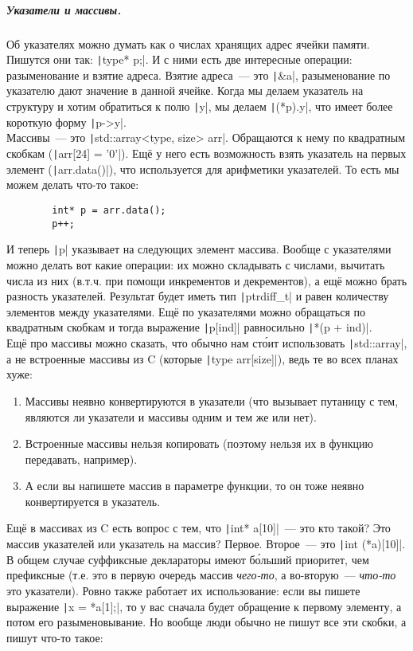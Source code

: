 \documentclass{article}
\begin{document}
    \subparagraph{Указатели и массивы.}
    Об указателях можно думать как о числах хранящих адрес ячейки памяти. Пишутся они так: \texttt|type* p;|. И с ними есть две интересные операции: разыменование и взятие адреса. Взятие адреса~--- это \texttt|&a|, разыменование по указателю дают значение в данной ячейке. Когда мы делаем указатель на структуру и хотим обратиться к полю \texttt|y|, мы делаем \texttt|(*p).y|, что имеет более короткую форму \texttt|p->y|.\\
    Массивы~--- это \texttt|std::array<type, size> arr|. Обращаются к нему по квадратным скобкам (\texttt|arr[24] = '0'|). Ещё у него есть возможность взять указатель на первых элемент (\texttt|arr.data()|), что используется для арифметики указателей. То есть мы можем делать что-то такое:
    \begin{verbatim}
        int* p = arr.data();
        p++;
    \end{verbatim}
    И теперь \texttt|p| указывает на следующих элемент массива. Вообще с указателями можно делать вот какие операции: их можно складывать с числами, вычитать числа из них (в.т.ч. при помощи инкрементов и декрементов), а ещё можно брать разность указателей. Результат будет иметь тип \texttt|ptrdiff_t| и равен количеству элементов между указателями. Ещё по указателями можно обращаться по квадратным скобкам и тогда выражение \texttt|p[ind]| равносильно \texttt|*(p + ind)|.\\
    Ещё про массивы можно сказать, что обычно нам ст\'{о}ит использовать \texttt|std::array|, а не встроенные массивы из C (которые \texttt|type arr[size]|), ведь те во всех планах хуже:
    \begin{enumerate}
        \item Массивы неявно конвертируются в указатели (что вызывает путаницу с тем, являются ли указатели и массивы одним и тем же или нет).
        \item Встроенные массивы нельзя копировать (поэтому нельзя их в функцию передавать, например).
        \item А если вы напишете массив в параметре функции, то он тоже неявно конвертируется в указатель.
    \end{enumerate}
    Ещё в массивах из C есть вопрос с тем, что \texttt|int* a[10]|~--- это кто такой? Это массив указателей или указатель на массив? Первое. Второе~--- это \texttt|int (*a)[10]|. В общем случае суффиксные деклараторы имеют б\'{о}льший приоритет, чем префиксные (т.е. это в первую очередь массив \textit{чего-то}, а во-вторую~--- \textit{что-то} это указатели). Ровно также работает их использование: если вы пишете выражение \texttt|x = *a[1];|, то у вас сначала будет обращение к первому элементу, а потом его разыменовывание. Но вообще люди обычно не пишут все эти скобки, а пишут что-то такое:
\end{document}
